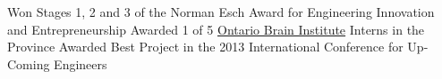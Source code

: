 %
%
%


\begin{scholarship}
			{Won Stages 1, 2 and 3 of the Norman Esch Award for Engineering Innovation and Entrepreneurship}			
			{Awarded 1 of 5 \href{https://braininstitute.ca/}{Ontario Brain Institute} Interns in the Province}	
			{Awarded Best Project in the 2013 International Conference for Up-Coming Engineers}			
\end{scholarship}